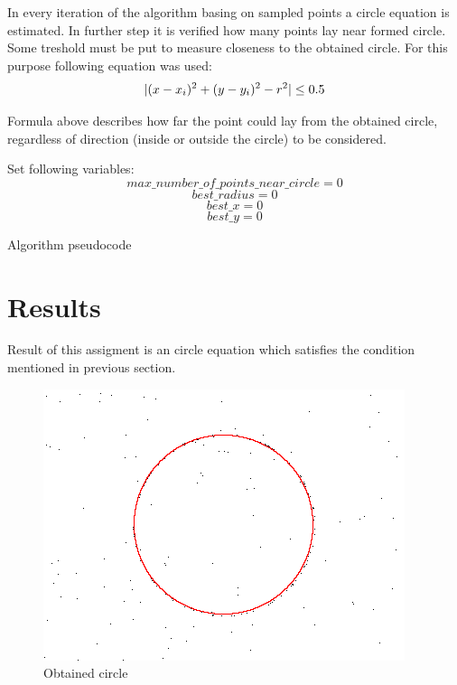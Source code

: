 \documentclass[notitlepage,english]{hgbreport}
\DeclarePairedDelimiter{\abs}{\lvert}{\rvert}
\begin{document}
In every iteration of the algorithm basing on sampled points a circle equation is estimated. In further step it is verified how many points lay near formed circle. Some treshold must be put to measure closeness to the obtained circle. For this purpose following equation was used:
\[\abs{(x-x_{i})^2+(y-y_{i})^2-r^2}\le0.5\]			

Formula above  describes how far the point could lay from the obtained circle, regardless of direction (inside or outside the circle) to be considered.

\begin{algorithm}[H]
\SetAlgoLined
{}
 Set following variables:
\[max\_number\_of\_points\_near\_circle=0\] 
 \[best\_radius=0\] 
 \[best\_x=0\] 
 \[best\_y=0\] 
 \caption{Algorithm pseudocode}
\end{algorithm}

\section {Results}

Result of this assigment is an circle equation which satisfies the condition mentioned in previous section.

\begin{figure}[!htbp]
\caption{Obtained circle}
\includegraphics{circle}
\end{figure}
\end{document}
